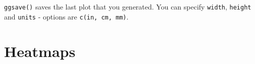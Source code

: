 \documentclass[]{book}
\begin{document}
\texttt{ggsave()} saves the last plot that you generated. You can
specify \texttt{width}, \texttt{height} and \texttt{units} - options are
\texttt{c(\textquotesingle{}in\textquotesingle{},\ \textquotesingle{}cm\textquotesingle{},\ \textquotesingle{}mm\textquotesingle{})}.

\chapter{Heatmaps}\label{heatmaps}
\end{document}
